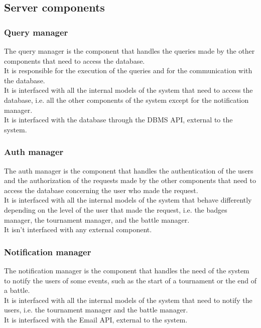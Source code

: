 \subsection{Server components}

\subsubsection*{Query manager}
The query manager is the component that handles the queries made by the other components that need to access the database. \\
It is responsible for the execution of the queries and for the communication with the database. \\
It is interfaced with all the internal models of the system that need to access the database, i.e. all the other components of the system except for the notification manager. \\
It is interfaced with the database through the DBMS API, external to the system.

\subsubsection*{Auth manager}
The auth manager is the component that handles the authentication of the users and the authorization of the requests made by the other components that need to access the database concerning the user who made the request.\\
It is interfaced with all the internal models of the system that behave differently depending on the level of the user that made the request, i.e. the badges manager, the tournament manager, and the battle manager.\\
It isn't interfaced with any external component.

\subsubsection*{Notification manager}
The notification manager is the component that handles the need of the system to notify the users of some events, such as the start of a tournament or the end of a battle. \\
It is interfaced with all the internal models of the system that need to notify the users, i.e. the tournament manager and the battle manager. \\
It is interfaced with the Email API, external to the system.

